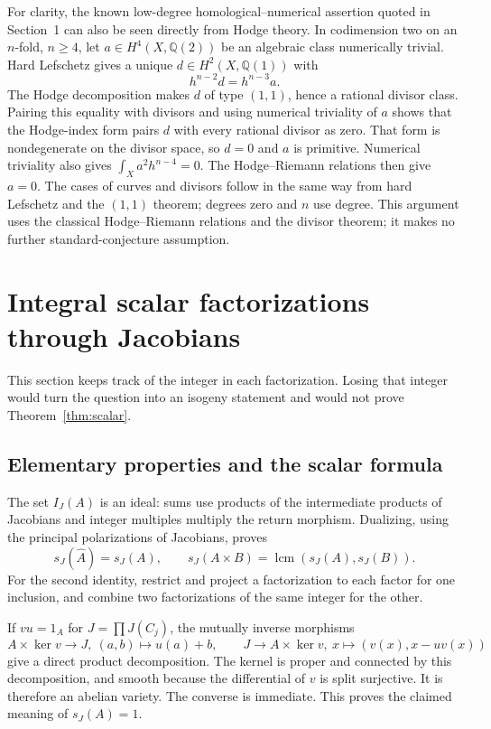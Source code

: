 \documentclass[11pt]{article}
\newcommand{\Q}{\mathbb Q}
\theoremstyle{definition}
\theoremstyle{remark}
\begin{document}
For clarity, the known low-degree homological--numerical assertion quoted in Section~1 can also be seen directly from Hodge theory. In codimension two on an $n$-fold, $n\geq4$, let $a\in H^4(X,\Q(2))$ be an algebraic class numerically trivial. Hard Lefschetz gives a unique $d\in H^2(X,\Q(1))$ with
\[
                 h^{n-2}d=h^{n-3}a.
\]
The Hodge decomposition makes $d$ of type $(1,1)$, hence a rational divisor class. Pairing this equality with divisors and using numerical triviality of $a$ shows that the Hodge-index form pairs $d$ with every rational divisor as zero. That form is nondegenerate on the divisor space, so $d=0$ and $a$ is primitive. Numerical triviality also gives $\int_Xa^2h^{n-4}=0$. The Hodge--Riemann relations then give $a=0$. The cases of curves and divisors follow in the same way from hard Lefschetz and the $(1,1)$ theorem; degrees zero and $n$ use degree. This argument uses the classical Hodge--Riemann relations and the divisor theorem; it makes no further standard-conjecture assumption.

\section{Integral scalar factorizations through Jacobians}

This section keeps track of the integer in each factorization. Losing that integer would turn the question into an isogeny statement and would not prove Theorem~\ref{thm:scalar}.

\subsection{Elementary properties and the scalar formula}

The set $I_J(A)$ is an ideal: sums use products of the intermediate products of Jacobians and integer multiples multiply the return morphism. Dualizing, using the principal polarizations of Jacobians, proves
\[
 s_J(\widehat A)=s_J(A),\qquad
 s_J(A\times B)=\operatorname{lcm}(s_J(A),s_J(B)).
\]
For the second identity, restrict and project a factorization to each factor for one inclusion, and combine two factorizations of the same integer for the other.

If $vu=1_A$ for $J=\prod J(C_j)$, the mutually inverse morphisms
\[
 A\times\ker v\longrightarrow J,\ (a,b)\longmapsto u(a)+b,
 \qquad
 J\longrightarrow A\times\ker v,\ x\longmapsto(v(x),x-uv(x))
\]
give a direct product decomposition. The kernel is proper and connected by this decomposition, and smooth because the differential of $v$ is split surjective. It is therefore an abelian variety. The converse is immediate. This proves the claimed meaning of $s_J(A)=1$.
\end{document}

